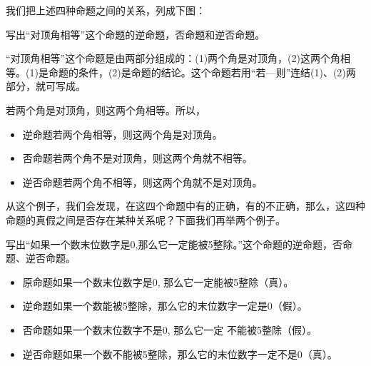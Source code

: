 我们把上述四种命题之间的关系，列成下图：
\begin{center}
\end{center}

\begin{example}
    写出“对顶角相等”这个命题的逆命题，否命题和逆否命题。
\end{example}

\begin{solution}
“对顶角相等”这个命题是由两部分组成的：(1)两个角是对顶角，(2)这两个角相等。(1)是命题的条件，(2)是命题的结论。这个命题若用“若—则”连结(1)、(2)两部分，就可写成。

若两个角是对顶角，则这两个角相等。所以，
\begin{itemize}
    \item 逆命题\quad 若两个角相等，则这两个角是对顶角。
    \item 否命题\quad 若两个角不是对顶角，则这两个角就不相等。
    \item 逆否命题\quad 若两个角不相等，则这两个角就不是对顶角。
\end{itemize}
\end{solution}

从这个例子，我们会发现，在这四个命题中有的正确，有的不正确，那么，这四种命题的真假之间是否存在某种关系呢？下面我们再举两个例子。

\begin{example}
    写出“如果一个数末位数字是0,那么它一定能被5整除。”这个命题的逆命题，否命题、逆否命题。
\begin{itemize}
    \item 原命题\quad 如果一个数末位数字是0, 那么它一定能被5整除（真）。
    \item 逆命题\quad 如果一个数能被5整除，那么它的末位数字一定是0（假）。
    \item 否命题\quad 如果一个数末位数字不是0, 那么它一定 不能被5整除（假）。
    \item 逆否命题\quad 如果一个数不能被5整除，那么它的末位数字一定不是0（真）。
\end{itemize}
\end{example}

